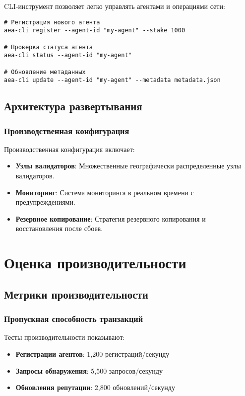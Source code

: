 \documentclass[12pt,a4paper]{article}
\begin{document}
CLI-инструмент позволяет легко управлять агентами и операциями сети:

\begin{verbatim}
# Регистрация нового агента
aea-cli register --agent-id "my-agent" --stake 1000

# Проверка статуса агента
aea-cli status --agent-id "my-agent"

# Обновление метаданных
aea-cli update --agent-id "my-agent" --metadata metadata.json
\end{verbatim}

\subsection{Архитектура развертывания}

\subsubsection{Производственная конфигурация}

Производственная конфигурация включает:

\begin{itemize}
\item \textbf{Узлы валидаторов}: Множественные географически распределенные узлы валидаторов.
\item \textbf{Мониторинг}: Система мониторинга в реальном времени с предупреждениями.
\item \textbf{Резервное копирование}: Стратегия резервного копирования и восстановления после сбоев.
\end{itemize}

\section{Оценка производительности}

\subsection{Метрики производительности}

\subsubsection{Пропускная способность транзакций}

Тесты производительности показывают:
\begin{itemize}
\item \textbf{Регистрации агентов}: 1,200 регистраций/секунду
\item \textbf{Запросы обнаружения}: 5,500 запросов/секунду
\item \textbf{Обновления репутации}: 2,800 обновлений/секунду
\end{itemize}
\end{document}
